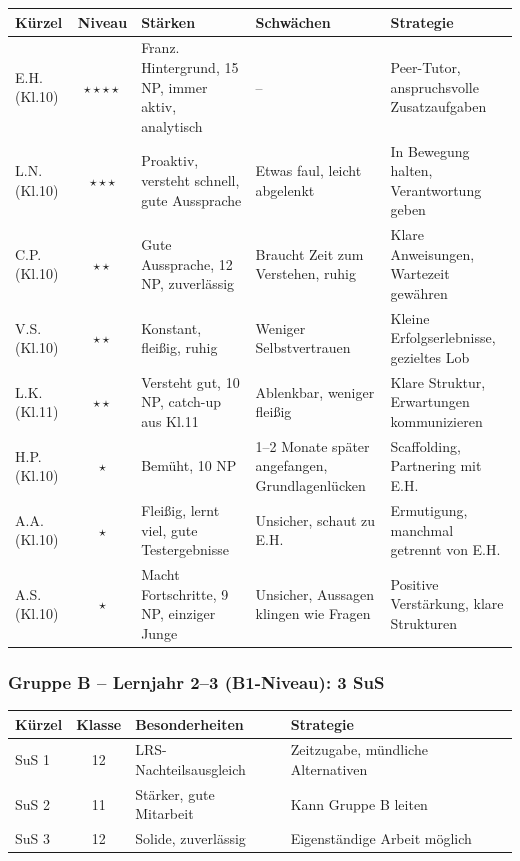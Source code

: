 \documentclass[11pt,a4paper]{article}
\begin{document}
\begin{tabular}{|l|c|p{3.5cm}|p{3.5cm}|p{3.5cm}|}
\hline
\textbf{Kürzel} & \textbf{Niveau} & \textbf{Stärken} & \textbf{Schwächen} & \textbf{Strategie} \\
\hline
E.H. (Kl.10) & $\star\star\star\star$ & Franz. Hintergrund, 15 NP, immer aktiv, analytisch & -- & Peer-Tutor, anspruchsvolle Zusatzaufgaben \\
\hline
L.N. (Kl.10) & $\star\star\star$ & Proaktiv, versteht schnell, gute Aussprache & Etwas faul, leicht abgelenkt & In Bewegung halten, Verantwortung geben \\
\hline
C.P. (Kl.10) & $\star\star$ & Gute Aussprache, 12 NP, zuverlässig & Braucht Zeit zum Verstehen, ruhig & Klare Anweisungen, Wartezeit gewähren \\
\hline
V.S. (Kl.10) & $\star\star$ & Konstant, fleißig, ruhig & Weniger Selbstvertrauen & Kleine Erfolgserlebnisse, gezieltes Lob \\
\hline
L.K. (Kl.11) & $\star\star$ & Versteht gut, 10 NP, catch-up aus Kl.11 & Ablenkbar, weniger fleißig & Klare Struktur, Erwartungen kommunizieren \\
\hline
H.P. (Kl.10) & $\star$ & Bemüht, 10 NP & 1--2 Monate später angefangen, Grundlagenlücken & Scaffolding, Partnering mit E.H. \\
\hline
A.A. (Kl.10) & $\star$ & Fleißig, lernt viel, gute Testergebnisse & Unsicher, schaut zu E.H. & Ermutigung, manchmal getrennt von E.H. \\
\hline
A.S. (Kl.10) & $\star$ & Macht Fortschritte, 9 NP, einziger Junge & Unsicher, Aussagen klingen wie Fragen & Positive Verstärkung, klare Strukturen \\
\hline
\end{tabular}

\subsubsection{Gruppe B -- Lernjahr 2--3 (B1-Niveau): 3 SuS}

\begin{tabular}{|l|c|p{5cm}|p{5cm}|}
\hline
\textbf{Kürzel} & \textbf{Klasse} & \textbf{Besonderheiten} & \textbf{Strategie} \\
\hline
SuS 1 & 12 & LRS-Nachteilsausgleich & Zeitzugabe, mündliche Alternativen \\
\hline
SuS 2 & 11 & Stärker, gute Mitarbeit & Kann Gruppe B leiten \\
\hline
SuS 3 & 12 & Solide, zuverlässig & Eigenständige Arbeit möglich \\
\hline
\end{tabular}
\end{document}
